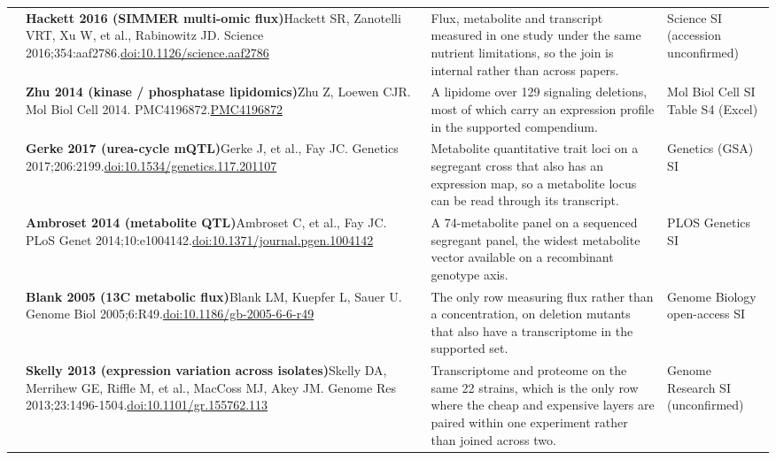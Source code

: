 \begin{landscape}
\begin{longtable}{@{}r@{\hspace{4pt}} L{86mm} L{92mm} L{62mm}@{}}
 & \textbf{Hackett 2016 (SIMMER multi-omic flux)}\newline Hackett SR, Zanotelli VRT, Xu W, et al., Rabinowitz JD. Science 2016;354:aaf2786.\newline \href{https://doi.org/10.1126/science.aaf2786}{doi:10.1126/\allowbreak science.aaf2786} & Flux, metabolite and transcript measured in one study under the same nutrient limitations, so the join is internal rather than across papers. & Science SI (accession unconfirmed) \\
 & \textbf{Zhu 2014 (kinase / phosphatase lipidomics)}\newline Zhu Z, Loewen CJR. Mol Biol Cell 2014. PMC4196872.\newline \href{https://pmc.ncbi.nlm.nih.gov/articles/PMC4196872/}{PMC4196872} & A lipidome over 129 signaling deletions, most of which carry an expression profile in the supported compendium. & Mol Biol Cell SI Table S4 (Excel) \\
 & \textbf{Gerke 2017 (urea-cycle mQTL)}\newline Gerke J, et al., Fay JC. Genetics 2017;206:2199.\newline \href{https://doi.org/10.1534/genetics.117.201107}{doi:10.1534/\allowbreak genetics.117.201107} & Metabolite quantitative trait loci on a segregant cross that also has an expression map, so a metabolite locus can be read through its transcript. & Genetics (GSA) SI \\
 & \textbf{Ambroset 2014 (metabolite QTL)}\newline Ambroset C, et al., Fay JC. PLoS Genet 2014;10:e1004142.\newline \href{https://doi.org/10.1371/journal.pgen.1004142}{doi:10.1371/\allowbreak journal.pgen.1004142} & A 74-metabolite panel on a sequenced segregant panel, the widest metabolite vector available on a recombinant genotype axis. & PLOS Genetics SI \\
 & \textbf{Blank 2005 (13C metabolic flux)}\newline Blank LM, Kuepfer L, Sauer U. Genome Biol 2005;6:R49.\newline \href{https://doi.org/10.1186/gb-2005-6-6-r49}{doi:10.1186/\allowbreak gb-2005-6-6-r49} & The only row measuring flux rather than a concentration, on deletion mutants that also have a transcriptome in the supported set. & Genome Biology open-access SI \\
 & \textbf{Skelly 2013 (expression variation across isolates)}\newline Skelly DA, Merrihew GE, Riffle M, et al., MacCoss MJ, Akey JM. Genome Res 2013;23:1496-1504.\newline \href{https://doi.org/10.1101/gr.155762.113}{doi:10.1101/\allowbreak gr.155762.113} & Transcriptome and proteome on the same 22 strains, which is the only row where the cheap and expensive layers are paired within one experiment rather than joined across two. & Genome Research SI (unconfirmed) \\

\end{longtable}
\end{landscape}
